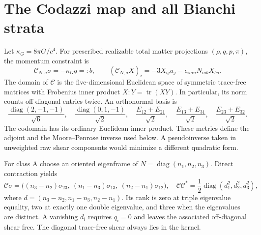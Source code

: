 \section{The Codazzi map and all Bianchi strata}

Let $\kappa_G=8\pi G/c^4$. For prescribed realizable total matter projections $(\rho,q,p,\pi)$, the momentum constraint is
\begin{equation}
 \mathcal C_{N,a}\sigma=-\kappa_Gq=:b,\qquad
 (\mathcal C_{N,a}X)_i=-3X_{ij}a_j-\epsilon_{imn}N_{mb}X_{bn}.
 \label{geo:codazzi}
\end{equation}
The domain of $\mathcal C$ is the five-dimensional Euclidean space of symmetric trace-free matrices with Frobenius inner product $X:Y=\operatorname{tr}(XY)$. In particular, its norm counts off-diagonal entries twice. An orthonormal basis is
\begin{equation}
 \frac{\operatorname{diag}(2,-1,-1)}{\sqrt6},\quad
 \frac{\operatorname{diag}(0,1,-1)}{\sqrt2},\quad
 \frac{E_{12}+E_{21}}{\sqrt2},\quad
 \frac{E_{13}+E_{31}}{\sqrt2},\quad
 \frac{E_{23}+E_{32}}{\sqrt2}.
 \label{geo:stf_basis}
\end{equation}
The codomain has its ordinary Euclidean inner product. These metrics define the adjoint and the Moore--Penrose inverse used below. A pseudoinverse taken in unweighted raw shear components would minimize a different quadratic form.

For class A choose an oriented eigenframe of $N=\operatorname{diag}(n_1,n_2,n_3)$. Direct contraction yields
\begin{equation}
 \mathcal C\sigma=
 \big((n_3-n_2)\sigma_{23},\ (n_1-n_3)\sigma_{13},\
      (n_2-n_1)\sigma_{12}\big),
 \quad
 \mathcal C\mathcal C^*=\frac12\operatorname{diag}(d_1^2,d_2^2,d_3^2),
 \label{geo:classA}
\end{equation}
where $d=(n_3-n_2,n_1-n_3,n_2-n_1)$. Its rank is zero at triple eigenvalue equality, two at exactly one double eigenvalue, and three when the eigenvalues are distinct. A vanishing $d_i$ requires $q_i=0$ and leaves the associated off-diagonal shear free. The diagonal trace-free shear always lies in the kernel.


